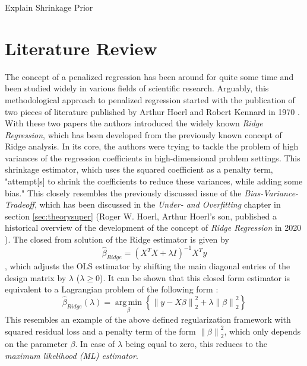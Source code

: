 \documentclass[12pt,a4paper]{article}
\newenvironment{lightbluebox}{%
    \begin{tcolorbox}[colback=lightblue, colframe=lightblue, fontupper=\itshape]%
}{%
    \end{tcolorbox}%
}
\newcommand{\norm}[1]{\left\lVert#1\right\rVert}
\DeclareMathOperator*{\argmin}{arg\,min}
\begin{document}
\begin{lightbluebox}
Explain Shrinkage Prior
\end{lightbluebox}


\newpage

\section{Literature Review}\label{sec:litreview}

The concept of a penalized regression has been around for quite some time and been studied widely in various fields of scientific research. Arguably, this methodological approach to penalized regression started with the publication of two pieces of literature published by Arthur Hoerl and Robert Kennard in 1970 \parencite{HoerlKennard1970a, HoerlKennard1970b}. With these two papers the authors introduced the widely known \textit{Ridge Regression}, which has been developed from the previously known concept of Ridge analysis. In its core, the authors were trying to tackle the problem of high variances of the regression coefficients in high-dimensional problem settings. This shrinkage estimator, which uses the squared coefficient as a penalty term, "attempt[s] to shrink the coefficients to
reduce these variances, while adding some bias." \parencite{Hoerl2020} This closely resembles the previously discussed issue of the \textit{Bias-Variance-Tradeoff}, which has been discussed in the \textit{Under- and Overfitting} chapter in section \ref{sec:theorysuper} (Roger W. Hoerl, Arthur Hoerl's son, published a historical overview of the development of the concept of \textit{Ridge Regression} in 2020 \parencite{Hoerl2020}). The closed from solution of the Ridge estimator is given by
$$\hat{\beta}_{Ridge} = \left(X^TX+\lambda I\right)^{-1}X^Ty$$,
which adjusts the OLS estimator by shifting the main diagonal entries of the design matrix by $\lambda$ ($\lambda \geq 0$). It can be shown that this closed form estimator is equivalent to a Lagrangian problem of the following form \parencite{VanWieringen2015}:
$$\hat{\beta}_{Ridge}(\lambda) = \underset{\beta}{\argmin}\left\{\norm{y-X\beta}_2^2 + \lambda\norm{\beta}_2^2\right\}$$
This resembles an example of the above defined regularization framework with squared residual loss and a penalty term of the form $\norm{\beta}_2^2$, which only depends on the parameter $\beta$. In case of $\lambda$ being equal to zero, this reduces to the \textit{maximum likelihood (ML) estimator}. 
\end{document}
